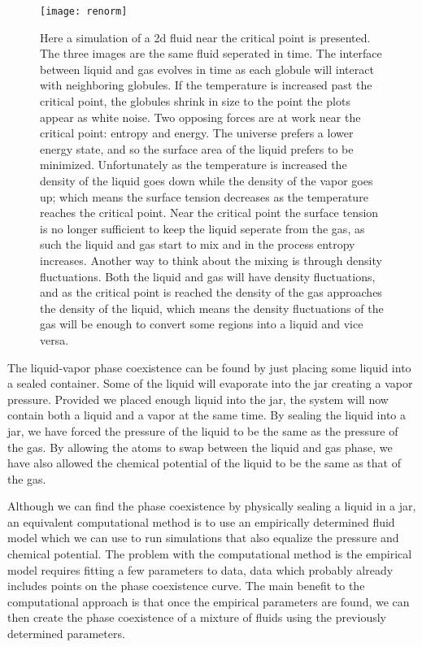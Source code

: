 \begin{figure}[h]
\vspace*{-0mm}
\hspace*{-6mm}
	\centering
	\texttt{[image: renorm]}
	\caption{
	\scriptsize
	Here a simulation of a 2d fluid near the critical point is presented. The three images are the same fluid seperated in time. The interface between liquid and gas evolves in time as each globule will interact with neighboring globules. If the temperature is increased past the critical point, the globules shrink in size to the point the plots appear as white noise. Two opposing forces are at work near the critical point: entropy and energy. The universe prefers a lower energy state, and so the surface area of the liquid prefers to be minimized. Unfortunately as the temperature is increased the density of the liquid goes down while the density of the vapor goes up; which means the surface tension decreases as the temperature reaches the critical point. Near the critical point the surface tension is no longer sufficient to keep the liquid seperate from the gas, as such the liquid and gas start to mix and in the process entropy increases. 
Another way to think about the mixing is through density fluctuations. Both the liquid and gas will have density fluctuations, and as the critical point is reached the density of the gas approaches the density of the liquid, which means the density fluctuations of the gas will be enough to convert some regions into a liquid and vice versa.}
	\label{fig:renorm}
\end{figure}

The liquid-vapor phase coexistence can be found by just placing some liquid into a sealed container. Some of the liquid will evaporate into the jar creating a vapor pressure. Provided we placed enough liquid into the jar, the system will now contain both a liquid and a vapor at the same time. By sealing the liquid into a jar, we have forced the pressure of the liquid to be the same as the pressure of the gas. By allowing the atoms to swap between the liquid and gas phase, we have also allowed the chemical potential of the liquid to be the same as that of the gas.

Although we can find the phase coexistence by physically sealing a liquid in a jar, an equivalent computational method is to use an empirically determined fluid model which we can use to run simulations that also equalize the pressure and chemical potential. The problem with the computational method is the empirical model requires fitting a few parameters to data, data which probably already includes points on the phase coexistence curve. The main benefit to the computational approach is that once the empirical parameters are found, we can then create the phase coexistence of a mixture of fluids using the previously determined parameters.

